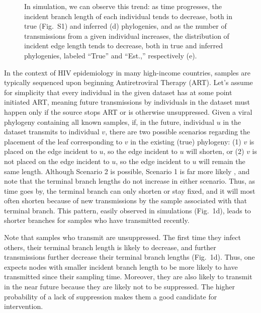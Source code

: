 \documentclass[oupdraft]{sysbio}
\newcommand{\PLWH}{sample\xspace}
\begin{document}
\begin{figure}[!tp]
{In simulation, we can observe this trend: as time progresses, the incident branch length of each individual tends to decrease, both in true (Fig.~S1) and inferred (d) phylogenies, and as the number of transmissions from a given individual increases, the distribution of incident edge length tends to decrease, both in true and inferred phylogenies, labeled ``True'' and ``Est.,'' respectively (e).}
\label{fig:diagram}
\end{figure}


In the context of HIV epidemiology in many high-income countries,
\PLWH{s} are typically sequenced
upon beginning Antiretroviral Therapy (ART).
Let's assume for simplicity that every individual in the given dataset has at some point initiated ART,
meaning future transmissions by individuals in the dataset must happen only if the source stops ART or is otherwise unsuppressed. %
Given a viral phylogeny containing all known \PLWH{s},
if, in the future,
individual $u$ in the dataset transmits to individual $v$,
there are two possible scenarios regarding the placement of the leaf corresponding to $v$ in the existing (true) phylogeny:
(1) $v$ is placed on the edge incident to $u$, so the edge incident to $u$ will shorten, or (2) $v$ is not placed on the edge incident to $u$, so the edge incident to $u$ will remain the same length.
Although Scenario 2 is possible,
Scenario 1 is far more likely \citep{Romero-Severson2016}, and note that the terminal branch lengths do not increase in either scenario. 
Thus, as time goes by, the terminal branch can only shorten or stay fixed, and it will most often shorten because of new transmissions by the \PLWH associated with that terminal branch.
This pattern, easily observed in simulations (Fig.~1d), leads to shorter branches for \PLWH{s} who have transmitted recently.

Note that \PLWH{s} who transmit are unsuppressed. The first time they infect others, their terminal branch length is likely to decrease, and further transmissions further decrease their terminal branch lengths (Fig.~1d). 
Thus, one expects nodes with smaller incident branch length to be more likely to have transmitted since their sampling time.
Moreover, they are also likely to transmit in the near future because they are likely not to be  suppressed. 
The higher probability of a lack of suppression makes them a good candidate for intervention. 
\end{document}
